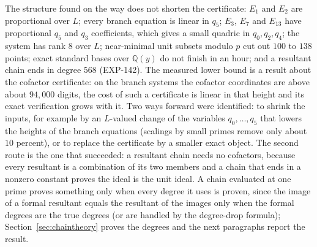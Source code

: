 \documentclass[11pt]{article}
\theoremstyle{remark}
\newcommand{\Q}{\mathbb{Q}}
\begin{document}
The structure found on the way does not shorten the certificate: $E_1$ and $E_2$ are proportional over $L$; every branch equation is linear in $q_5$; $E_3$, $E_7$ and $E_{13}$
have proportional $q_5$ and $q_3$ coefficients, which gives a small quadric in $q_0,q_2,q_4$; the system has rank $8$ over $L$; near-minimal unit subsets
modulo $p$ cut out $100$ to $138$ points; exact standard bases over $\Q(y)$ do not finish in an hour; and a resultant chain ends in degree $568$ (EXP-142).
The measured lower bound is a result about the cofactor certificate: on the branch systems the cofactor coordinates are above about $94{,}000$ digits, the cost of such a certificate is
linear in that height and its exact verification grows with it. Two ways forward were identified: to shrink the inputs, for example by an $L$-valued change of the variables $q_0,\dots,q_5$ that lowers the heights of the branch equations (scalings by small primes remove only
about $10$ percent), or to replace the certificate by a smaller exact object. The second route is the one that succeeded: a resultant chain needs no cofactors, because every resultant is a combination of its two members and a chain that ends in a nonzero constant proves the ideal is the unit ideal.
A chain evaluated at one prime proves something only when every degree it uses is proven, since the image of a formal resultant equals the resultant of the images only when the formal degrees are the true degrees (or are handled by the degree-drop formula); Section~\ref{sec:chaintheory} proves the degrees and the next paragraphs report the result.
\end{document}
